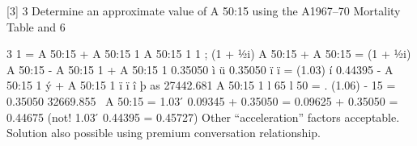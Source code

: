 \documentclass[a4paper,12pt]{article}
\begin{document}
[3]
3 Determine an approximate value of A 50:15 using the A1967–70 Mortality Table
and 6%


3
1
= A 50:15
+ A 50:15 1
A 50:15
1
1
; (1 + 1⁄2i) A 50:15
+ A 50:15
{
}
= (1 + 1⁄2i) A 50:15 - A 50:15 1 + A 50:15 1
0.35050
ì
ü 0.35050
ï
ï
= (1.03) í 0.44395 - A 50:15 1 ý + A 50:15 1
ï
ï
î
þ
as
27442.681
A 50:15 1
l 65
l 50
=
. (1.06) - 15 = 0.35050
32669.855
\ A 50:15
= 1.03  ́ 0.09345 + 0.35050
= 0.09625 + 0.35050
= 0.44675
(not! 1.03  ́ 0.44395 = 0.45727)
Other “acceleration” factors acceptable. Solution also possible using premium
conversation relationship.
\end{document}
